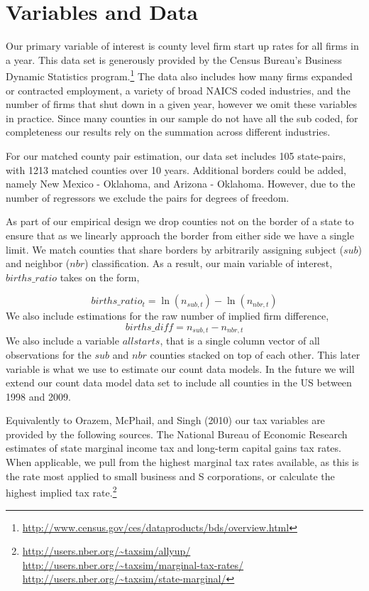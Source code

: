 \section{Variables and Data}

Our primary variable of interest is county level firm start up rates for all firms in a year. This data set is generously provided by the Census Bureau's Business Dynamic Statistics program.\footnote{\url{http://www.census.gov/ces/dataproducts/bds/overview.html}} The data also includes how many firms expanded or contracted employment, a variety of broad NAICS coded industries, and the number of firms that shut down in a given year, however we omit these variables in practice. Since many counties in our sample do not have all the sub coded, for completeness our results rely on the summation across different industries. 

For our matched county pair estimation, our data set includes 105 state-pairs, with 1213 matched counties over 10 years. Additional borders could be added, namely New Mexico - Oklahoma, and Arizona - Oklahoma. However, due to the number of regressors we exclude the pairs for degrees of freedom.

As part of our empirical design we drop counties not on the border of a state to ensure that as we linearly approach the border from either side we have a single limit. We match counties that share borders by arbitrarily assigning subject ($sub$) and neighbor ($nbr$) classification. As a result, our main variable of interest, $births\_ratio$ takes on the form, 

\begin{equation} births\_ratio_{t} = \ln(n_{sub,t})-\ln(n_{nbr,t})\end{equation}
We also include estimations for the raw number of implied firm difference, 
\begin{equation} births\_diff = n_{sub,t} - n_{nbr,t} \end{equation}
We also include a variable $allstarts$, that is a single column vector of all observations for the $sub$ and $nbr$ counties stacked on top of each other. This later variable is what we use to estimate our count data models. In the future we will extend our count data model data set to include all counties in the US between 1998 and 2009.

Equivalently to Orazem, McPhail, and Singh (2010) our tax variables are provided by the following sources. The National Bureau of Economic Research estimates of state marginal income tax and long-term capital gains tax rates. When applicable, we pull from the highest marginal tax rates available, as this is the rate most applied to small business and S corporations, or calculate the highest implied tax rate.\footnote{\url{http://users.nber.org/~taxsim/allyup/} \url{http://users.nber.org/~taxsim/marginal-tax-rates/} \url{http://users.nber.org/~taxsim/state-marginal/}}


